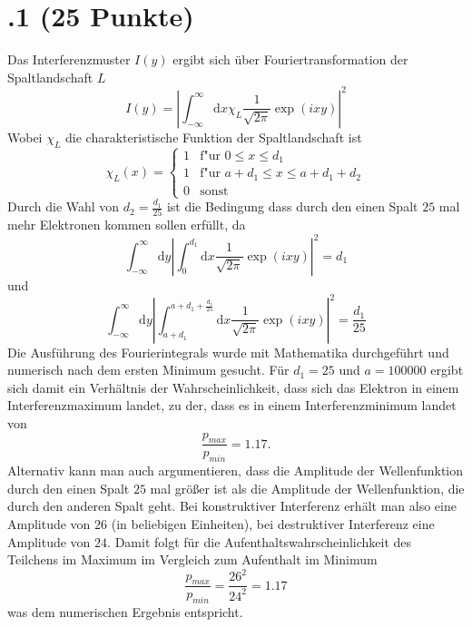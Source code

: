 \section*{\nr.1 \titone (25 Punkte)}
Das Interferenzmuster $I(y)$ ergibt sich über Fouriertransformation der Spaltlandschaft $L$
\begin{equation}
  I(y)=|\int_{-\infty}^{\infty} \mathrm{d}x \chi_L \frac{1}{\sqrt{2 \pi}}\exp\left(ixy\right)|^2
\end{equation}
Wobei $\chi_L$ die charakteristische Funktion der Spaltlandschaft ist 
\begin{equation}
   \chi_L(x) =
   \begin{cases}
     1 & \text{f"ur } 0 \leq x \leq d_1 \\
     1 & \text{f"ur } a + d_1 \leq x \leq a + d_1 + d_2 \\
     0  & \text{sonst}
   \end{cases}
\end{equation}
Durch die Wahl von $d_2 = \frac{d_1}{25}$ ist die Bedingung dass durch den einen Spalt $25$ mal mehr Elektronen kommen sollen erfüllt, da
\begin{equation}
  \int_{-\infty}^{\infty} \mathrm{d}y |\int_{0}^{d_1} \mathrm{d}x \frac{1}{\sqrt{2 \pi}}\exp\left(ixy\right)|^2 =d_1
\end{equation}
und 
\begin{equation}
  \int_{-\infty}^{\infty} \mathrm{d}y |\int_{a+d_1}^{a+d_1+\frac{d_1}{25}} \mathrm{d}x \frac{1}{\sqrt{2 \pi}}\exp\left(ixy\right)|^2 =\frac{d_1}{25}
\end{equation}
Die Ausführung des Fourierintegrals wurde mit Mathematika durchgeführt und numerisch nach dem ersten Minimum gesucht. Für $d_1=25$ und $a=100000$ ergibt sich damit ein Verhältnis der Wahrscheinlichkeit, dass sich das Elektron in einem Interferenzmaximum landet, zu der, dass es in einem Interferenzminimum landet von
\begin{equation}
  \frac{p_{max}}{p_{min}}=1.17.
\end{equation}
Alternativ kann man auch argumentieren, dass die Amplitude der Wellenfunktion durch den einen Spalt $25$ mal größer ist als die Amplitude der Wellenfunktion, die durch den anderen Spalt geht. Bei konstruktiver Interferenz erhält man also eine Amplitude von $26$ (in beliebigen Einheiten), bei destruktiver Interferenz eine Amplitude von $24$. Damit folgt für die Aufenthaltswahrscheinlichkeit des Teilchens im Maximum im Vergleich zum Aufenthalt im Minimum
\begin{equation}
  \frac{p_{max}}{p_{min}}=\frac{26^2}{24^2}=1.17
\end{equation}
was dem numerischen Ergebnis entspricht.


